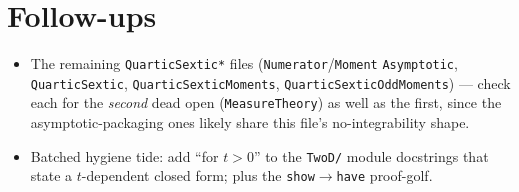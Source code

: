 \documentclass[11pt]{article}
\begin{document}
\section{Follow-ups}
\begin{itemize}[noitemsep]
  \item The remaining \texttt{QuarticSextic*} files (\texttt{Numerator}/\texttt{Moment}%
    \texttt{Asymptotic}, \texttt{QuarticSextic}, \texttt{QuarticSexticMoments},
    \texttt{QuarticSexticOddMoments}) --- check each for the \emph{second} dead open
    (\texttt{MeasureTheory}) as well as the first, since the asymptotic-packaging ones likely share
    this file's no-integrability shape.
  \item Batched hygiene tide: add ``for $t>0$'' to the \texttt{TwoD/} module docstrings that state
    a $t$-dependent closed form; plus the \texttt{show}$\to$\texttt{have} proof-golf.
\end{itemize}
\end{document}
